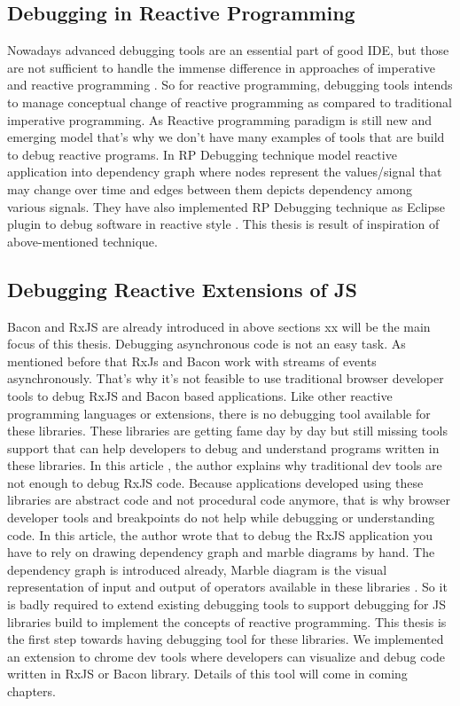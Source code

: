 \subsection{Debugging in Reactive Programming}
Nowadays advanced debugging tools are an essential part of good IDE, but those are not sufficient to handle the immense difference in approaches of imperative and reactive programming \citep{Salvaneschi:2016:DRP:2884781.2884815}.
So for reactive programming, debugging tools intends to manage conceptual change of reactive programming as compared to traditional imperative programming. As Reactive programming paradigm is still new and emerging model that's why we don't have many examples of tools that are build to debug reactive programs. 
In RP Debugging technique model reactive application into dependency graph where nodes represent the values/signal that may change over time and edges between them depicts dependency among various signals. They have also implemented RP Debugging technique as Eclipse plugin to debug software in reactive style \citep{Salvaneschi:2016:DRP:2884781.2884815}. This thesis is result of inspiration of above-mentioned technique. 

\subsection{Debugging Reactive Extensions of JS}
Bacon and RxJS are already introduced in above sections xx will be the main focus of this thesis. Debugging asynchronous code is not an easy task. As mentioned before that RxJs and Bacon work with streams of events asynchronously. That's why it's not feasible to use traditional browser developer tools to debug RxJS and Bacon based applications.
Like other reactive programming languages or extensions, there is no debugging tool available for these libraries. These libraries are getting fame day by day but still missing tools support that can help developers to debug and understand programs written in these libraries.
In this article \citep{StaltzAticleHowToDebugRxJS}, the author explains why traditional dev tools are not enough to debug RxJS code. Because applications developed using these libraries are abstract code and not procedural code anymore, that is why browser developer tools and breakpoints do not help while debugging or understanding code. In this article, the author wrote that to debug the RxJS application you have to rely on drawing dependency graph and marble diagrams by hand. The dependency graph is introduced already, Marble diagram is the visual representation of input and output of operators available in these libraries \citep{StaltzMarbleDiagrams}.
So it is badly required to extend existing debugging tools to support debugging for JS libraries build to implement the concepts of reactive programming.
This thesis is the first step towards having debugging tool for these libraries. We implemented an extension to chrome dev tools where developers can visualize and debug code written in RxJS or Bacon library. Details of this tool will come in coming chapters.

